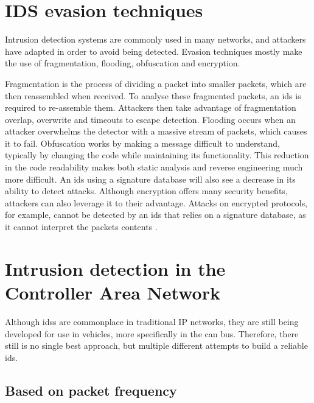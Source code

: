 \section{IDS evasion techniques}

Intrusion detection systems are commonly used in many networks, and attackers have adapted in order to avoid being detected. Evasion techniques mostly make the use of fragmentation, flooding, obfuscation and encryption.\par
Fragmentation is the process of dividing a packet into smaller packets, which are then reassembled when received. To analyse these fragmented packets, an \gls{ids} is required to re-assemble them. Attackers then take advantage of fragmentation overlap, overwrite and timeouts to escape detection. Flooding occurs when an attacker overwhelms the detector with a massive stream of packets, which causes it to fail. Obfuscation works by making a message difficult to understand, typically by changing the code while maintaining its functionality. This reduction in the code readability makes both static analysis and reverse engineering much more difficult. An \gls{ids} using a signature database will also see a decrease in its ability to detect attacks. Although encryption offers many security benefits, attackers can also leverage it to their advantage. Attacks on encrypted protocols, for example, cannot be detected by an \gls{ids} that relies on a signature database, as it cannot interpret the packets contents \citep{Khraisat2019}.

\section{Intrusion detection in the Controller Area Network}
\label{sec:can_ids}

Although \glspl{ids} are commonplace in traditional IP networks, they are still being developed for use in vehicles, more specifically in the \gls{can} bus. Therefore, there still is no single best approach, but multiple different attempts to build a reliable \gls{ids}.

\subsection{Based on packet frequency}

